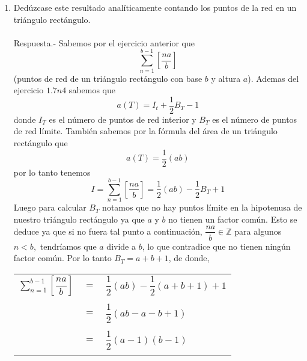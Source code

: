 \begin{enumerate}[ \bfseries 1.]
\begin{enumerate}[\bfseries (a)]
	    \item Dedúzcase este resultado analíticamente contando los puntos de la red en un triángulo rectángulo.\\\\
		Respuesta.-\; Sabemos por el ejercicio anterior que $$\sum\limits_{n=1}^{b-1}\left[\dfrac{na}{b}\right]$$ (puntos de red de un triángulo rectángulo con base $b$ y altura $a$). Ademas del ejercicio $1.7 n 4$ sabemos que $$a(T)=I_t + \dfrac{1}{2}B_T - 1$$ donde $I_T$ es el número de puntos de red interior y $B_T$ es el número de puntos de red límite. También sabemos por la fórmula del área de un triángulo rectángulo que $$a(T)=\dfrac{1}{2}(ab)$$ por lo tanto tenemos $$I=\sum\limits_{n=1}^{b-1}\left[\dfrac{na}{b}\right]=\dfrac{1}{2}(ab)-\dfrac{1}{2}B_T + 1$$
		Luego para calcular $B_T$ notamos que no hay puntos límite en la hipotenusa de nuestro triángulo rectángulo ya que $a$ y $b$ no tienen un factor común. Esto se deduce ya que si no fuera tal punto a continuación, $\dfrac{na}{b} \in \mathbb{Z}$ para algunos $n<b,$ tendríamos que $a$ divide a $b$, lo que contradice que no tienen ningún factor común. Por lo tanto $B_T=a+b+1$, de donde,
		\begin{center}
		    \begin{tabular}{rcl}
			$\sum\limits_{n=1}^{b-1} \left[\dfrac{na}{b}\right]$&$=$&$\dfrac{1}{2}(ab) - \dfrac{1}{2}(a+b+1) + 1$\\\\
			&$=$&$\dfrac{1}{2} (ab-a-b+1)$\\\\
			&$=$&$\dfrac{1}{2}(a-1)(b-1)$\\\\
		    \end{tabular}
		\end{center}


\end{enumerate}
\end{enumerate}
